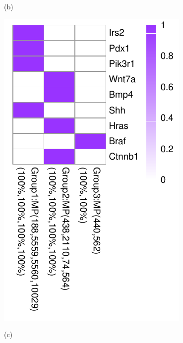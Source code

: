 \documentclass{bmcart}
\begin{document}
\begin{figure}[!h]
\begin{minipage}[b]{.45\linewidth}
    \centerline{(b)}
  \end{minipage}
  \vfil
  \begin{minipage}{.3\linewidth}
   \includegraphics[width=\linewidth]{DrawPictures/v0.pdf}
    \centerline{(c)}
  \end{minipage}
  \hfil
  \begin{minipage}{.3\linewidth}

\end{minipage}
\end{figure}
\end{document}
